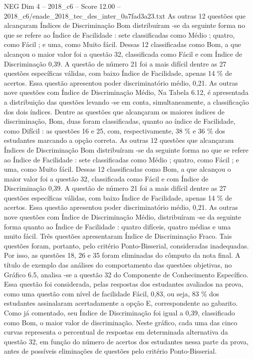\begin{textsample}{NEG Dim 4 – 2018\_c6 – Score 12.00 – 2018\_c6/enade\_2018\_tec\_des\_inter\_0a7fad3a23.txt}
As outras 12 questões que alcançaram Índices de Discriminação Bom distribuíram -se da seguinte forma no que se refere ao Índice de Facilidade : sete classificadas como Médio ; quatro, como Fácil ; e uma, como Muito fácil.
Dessas 12 classificadas como Bom, a que alcançou o maior valor foi a questão 32, classificada como Fácil e com Índice de Discriminação 0,39.
A questão de número 21 foi a mais difícil dentre as 27 questões específicas válidas, com baixo Índice de Facilidade, apenas 14 \% de acertos.
Essa questão apresentou poder discriminatório médio, 0,21.
As outras nove questões com Índice de Discriminação Médio, Na Tabela 6.12, é apresentada a distribuição das questões levando -se em conta, simultaneamente, a classificação dos dois índices.
Dentre as questões que alcançaram os maiores índices de discriminação, Bom, duas foram classificadas, quanto ao índice de Facilidade, como Difícil : as questões 16 e 25, com, respectivamente, 38 \% e 36 \% dos estudantes marcando a opção correta.
As outras 12 questões que alcançaram Índices de Discriminação Bom distribuíram -se da seguinte forma no que se refere ao Índice de Facilidade : sete classificadas como Médio ; quatro, como Fácil ; e uma, como Muito fácil.
Dessas 12 classificadas como Bom, a que alcançou o maior valor foi a questão 32, classificada como Fácil e com Índice de Discriminação 0,39.
A questão de número 21 foi a mais difícil dentre as 27 questões específicas válidas, com baixo Índice de Facilidade, apenas 14 \% de acertos.
Essa questão apresentou poder discriminatório médio, 0,21.
As outras nove questões com Índice de Discriminação Médio, distribuíram -se da seguinte forma quanto ao Índice de Facilidade : quatro difíceis, quatro médias e uma muito fácil.
Três questões apresentaram Índice de Discriminação Fraco.
Tais questões foram, portanto, pelo critério Ponto-Bisserial, consideradas inadequadas.
Por isso, as questões 18, 26 e 35 foram eliminadas do cômputo da nota final.
A título de exemplo das análises do comportamento das questões objetivas, no Gráfico 6.5, analisa -se a questão 32 do Componente de Conhecimento Específico.
Essa questão foi considerada, pelas respostas dos estudantes avaliados na prova, como uma questão com nível de facilidade Fácil, 0,83, ou seja, 83 \% dos estudantes assinalaram acertadamente a opção E, correspondente ao gabarito.
Como já comentado, seu Índice de Discriminação foi igual a 0,39, classificado como Bom, o maior valor de discriminação.
Neste gráfico, cada uma das cinco curvas representa o percentual de respostas em determinada alternativa da questão 32, em função do número de acertos dos estudantes nessa parte da prova, antes de possíveis eliminações de questões pelo critério Ponto-Bisserial.

\end{textsample}
